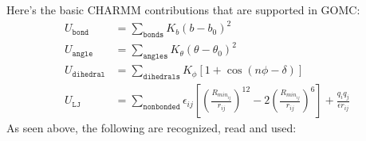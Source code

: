 \documentclass[letterpaper,10pt,english]{sphinxmanual}
\begin{document}
Here’s the basic CHARMM contributions that are supported in GOMC:
\begin{equation*}
\begin{split}U_{\texttt{bond}}&=\sum_{\texttt{bonds}} K_b(b-b_0)^2\\
U_{\texttt{angle}}&=\sum_{\texttt{angles}} K_{\theta}(\theta-\theta_0)^2\\
U_{\texttt{dihedral}}&=\sum_{\texttt{dihedrals}} K_{\phi} [1+\cos(n\phi - \delta)]\\
U_{\texttt{LJ}}&=\sum_{\texttt{nonbonded}} \epsilon_{ij}\left[\left(\frac{R_{min_{ij}}}{r_{ij}}\right)^{12}-2\left(\frac{R_{min_{ij}}}{r_{ij}}\right)^6\right]+ \frac{q_i q_j}{\epsilon r_{ij}}\end{split}
\end{equation*}
As seen above, the following are recognized, read and used:
\end{document}
